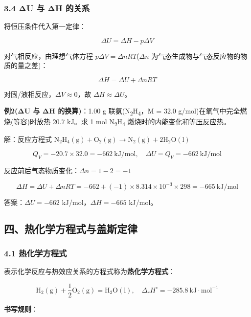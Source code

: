 \subsubsection{3.4 ΔU 与 ΔH 的关系}\label{ux3b4u-ux4e0e-ux3b4h-ux7684ux5173ux7cfb}

将恒压条件代入第一定律：

\[
\Delta U = \Delta H - p\Delta V
\]

对气相反应，由理想气体方程 \(p\Delta V = \Delta nRT\)(\(\Delta n\) 为气态生成物与气态反应物的物质的量之差)：

\[
\boxed{\Delta H = \Delta U + \Delta nRT}
\]

对固/液相反应，\(\Delta V \approx 0\)，故 \(\Delta H \approx \Delta U\)。

\textbf{例2(ΔU 与 ΔH 的换算)}：1.00 g 联氨(N\textsubscript{2}H\textsubscript{4}，M = 32.0 g/mol)在氧气中完全燃烧(等容)时放热 20.7 kJ。求 1 mol N\textsubscript{2}H\textsubscript{4} 燃烧时的内能变化和等压反应热。

解：反应方程式 \(\mathrm{N_2H_4(g) + O_2(g) \to N_2(g) + 2H_2O(l)}\)

\[Q_V = -20.7 \times 32.0 = -662\ \mathrm{kJ/mol}, \quad \Delta U = Q_V = -662\ \mathrm{kJ/mol}\]

反应前后气态物质变化：\(\Delta n = 1 - 2 = -1\)

\[\Delta H = \Delta U + \Delta nRT = -662 + (-1) \times 8.314 \times 10^{-3} \times 298 = -665\ \mathrm{kJ/mol}\]

答案：\(\Delta U = -662\) kJ/mol，\(\Delta H = -665\) kJ/mol。

\subsection{四、热化学方程式与盖斯定律}\label{ux56dbux70edux5316ux5b66ux65b9ux7a0bux5f0fux4e0eux76d6ux65afux5b9aux5f8b}

\subsubsection{4.1 热化学方程式}\label{ux70edux5316ux5b66ux65b9ux7a0bux5f0f}

表示化学反应与热效应关系的方程式称为\textbf{热化学方程式}：

\[
\mathrm{H_2(g) + \frac{1}{2}O_2(g) = H_2O(l)}, \quad \Delta_r H^\circ = -285.8\ \mathrm{kJ \cdot mol^{-1}}
\]

\textbf{书写规则}：

